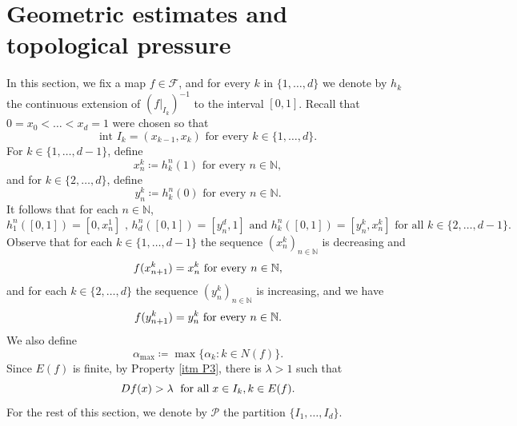 \documentclass[12pt]{amsart}
\numberwithin{equation}{section} %
\numberwithin{figure}{section} %
\theoremstyle{plain}
\theoremstyle{definition}
\theoremstyle{remark}
\theoremstyle{citing}
\newcommand{\N}{\mathbb{N}}
\newcommand{\sF}{\mathscr{F}}
\renewcommand{\=}{\coloneqq}
\begin{document}
\section{Geometric estimates and topological pressure}\label{sec: geometric estimates and top pressure}
In this section, we fix a map $f\in\sF$, and for every $k$ in $\{1,\ldots,d\}$ we denote by $h_k$ the continuous extension of $(f|_{I_k})^{-1}$ to the interval $[0,1]$. Recall that $0=x_0<\dots<x_d=1$ were chosen so that
\begin{equation}
    \text{int }I_k=(x_{k-1},x_{k}) \text{ for every } k\in\{1,\ldots,d\}.
\end{equation}
For $k\in \{1,\ldots,d-1\}$, define
\begin{equation}\label{e: defi x_n^k}
    x_n^k\= h_k^n(1) \text{ for every }n\in \N,
\end{equation}
and for $k\in\{2,\ldots,d\}$, define
\begin{equation}\label{e: defi y_n^k}
    y_n^k \= h_k^n (0) \text{ for every }n\in\N.
\end{equation}
It follows that for each $n\in\N$,
\begin{equation*}
    h_1^n([0,1]) = [0,x_{n}^1]\text{ , }h_d^n([0,1]) = [y_{n}^d,1] \text{ and } h_k^n([0,1]) = [y_{n}^k , x_n^k] \text{ for all } k\in\{2,\ldots,d-1\}.
\end{equation*}
Observe that for each $k\in\{1,\ldots,d-1\}$ the sequence $(x_{n}^k)_{n\in\N}$ is decreasing and 
\begin{equation}\label{e: f(x_{n+1}) = x_{n}}
f(x_{n+1}^k)= x_n^k \text{ for every }n\in\N,
\end{equation}
and for each  $k\in\{2,\ldots,d\}$ the sequence $ (y_{n}^k)_{n\in \N}$ is increasing, and we have
\begin{equation}\label{e: f(y_{n+1})= y_{n}}
f(y_{n+1}^k)= y_n^k \text{ for every } n\in\N.
\end{equation}
We also define 
\begin{equation}
\alpha_{\max}\= \max\{\alpha_k: k\in N(f)\}.
\end{equation}
Since $E(f)$ is finite, by Property \ref{itm P3}, there is $\lambda>1$ such that
\begin{equation}\label{eq exp bound}
    Df(x) >\lambda \text{ \;for all\;}x\in I_k, k\in E(f).
\end{equation}
For the rest of this section, we denote by $\mathcal{P}$ the partition $\{I_1,\ldots,I_d\}$.
\end{document}
